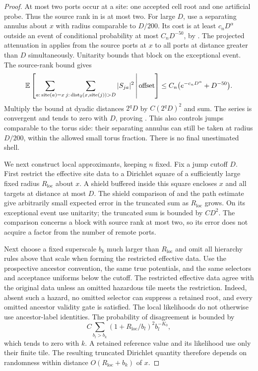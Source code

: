\begin{proof}
At most two ports occur at a site: one accepted cell root and one
artificial probe. Thus the source rank in
 is at most two. For large $D$, use a
separating annulus about $x$ with radius comparable to $D/200$.
Its cost is at least $c_nD^\alpha$ outside an event of conditional
probability at most $C_nD^{-50}$, by .
The projected attenuation in  applies from
the source ports at $x$ to all ports at distance greater than $D$
simultaneously. Unitarity bounds that block on the exceptional event.
The source-rank bound gives
\begin{equation}
 \mathbb E\left[\sum_{a:\,\operatorname{site}(a)=x}
     \sum_{j:\,\operatorname{dist}_2(x,\operatorname{site}(j))>D}|S_{ja}|^2
        \,\middle|\,\text{offset}\right]
 \leq C_n\bigl(e^{-c_nD^\alpha}+D^{-50}\bigr).
 \label{screen:mass-tail}
\end{equation}
Multiply the bound at dyadic distances $2^qD$ by
$C(2^qD)^2$ and sum. The series is convergent and tends to zero
with $D$, proving .
This also controls jumps comparable to the torus side: their
separating annulus can still be taken at radius $D/200$, within the
allowed small torus fraction. There is no final unestimated shell.

We next construct local approximants, keeping $n$ fixed. Fix a jump
cutoff $D$. First restrict the effective site data to a Dirichlet
square of a sufficiently large fixed radius $R_{\mathrm{loc}}$
about $x$. A shield buffered inside this square encloses $x$ and all
targets at distance at most $D$. The shield comparison of
 and the path estimate give arbitrarily small
expected error in the truncated sum as $R_{\mathrm{loc}}$ grows.
On its exceptional event use unitarity; the truncated sum is bounded
by $CD^2$. The comparison concerns a block with source rank at most
two, so its error does not acquire a factor from the number of remote
ports.

Next choose a fixed superscale $b_k$ much larger than
$R_{\mathrm{loc}}$ and omit all hierarchy rules above that scale
when forming the restricted effective data. Use the prospective
ancestor convention, the same true potentials, and the same
selectors and acceptance uniforms below the cutoff.
The restricted effective data agree with the original data unless an
omitted hazardous tile meets the restriction. Indeed, absent such a
hazard, no omitted selector can suppress a retained root, and every
omitted ancestor validity gate is satisfied. The local likelihoods
do not otherwise use ancestor-label identities. The probability of
disagreement is bounded by
\[
 C\sum_{b_l>b_k}(1+R_{\mathrm{loc}}/b_l)^2b_l^{-K_0},
\]
which tends to zero with $k$. A retained reference value and its
likelihood use only their finite tile. The resulting truncated
Dirichlet quantity therefore depends on randomness within distance
$O(R_{\mathrm{loc}}+b_k)$ of $x$.


\end{proof}
